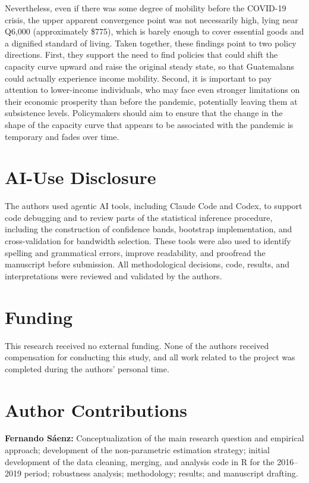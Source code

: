 \documentclass{article}
\begin{document}
Nevertheless, even if there was some degree of mobility before the COVID-19 crisis, the upper apparent convergence point was not necessarily high, lying near Q6,000 (approximately \$775), which is barely enough to cover essential goods and a dignified standard of living. Taken together, these findings point to two policy directions. First, they support the need to find policies that could shift the capacity curve upward and raise the original steady state, so that Guatemalans could actually experience income mobility. Second, it is important to pay attention to lower-income individuals, who may face even stronger limitations on their economic prosperity than before the pandemic, potentially leaving them at subsistence levels. Policymakers should aim to ensure that the change in the shape of the capacity curve that appears to be associated with the pandemic is temporary and fades over time.

\section{AI-Use Disclosure}

The authors used agentic AI tools, including Claude Code and Codex, to support code debugging and to review parts of the statistical inference procedure, including the construction of confidence bands, bootstrap implementation, and cross-validation for bandwidth selection. These tools were also used to identify spelling and grammatical errors, improve readability, and proofread the manuscript before submission. All methodological decisions, code, results, and interpretations were reviewed and validated by the authors.

\section{Funding}

This research received no external funding. None of the authors received compensation for conducting this study, and all work related to the project was completed during the authors' personal time.

\section{Author Contributions}

\textbf{Fernando Sáenz:} Conceptualization of the main research question and empirical approach; development of the non-parametric estimation strategy; initial development of the data cleaning, merging, and analysis code in R for the 2016--2019 period; robustness analysis; methodology; results; and manuscript drafting.
\end{document}

